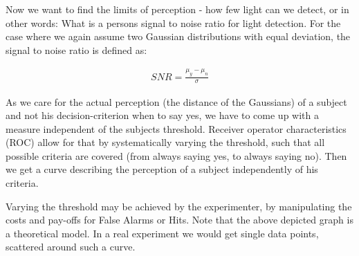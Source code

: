 \documentclass[../main/Notes.tex]{subfiles}
\begin{document}
Now we want to find the limits of perception - how few light can we detect, or in other words: What is a persons signal to noise ratio for light detection. For the case where we again assume two Gaussian distributions with equal deviation, the signal to noise ratio is defined as:

\begin{align*}
SNR = \frac{\mu_y-\mu_n}{\sigma}  
\end{align*} 

As we care for the actual perception (the distance of the Gaussians) of a subject and not his decision-criterion when to say yes, we have to come up with a measure independent of the subjects threshold. Receiver operator characteristics (ROC) allow for that by systematically varying the threshold, such that all possible criteria are covered (from always saying yes, to always saying no). Then we get a curve describing the perception of a subject independently of his criteria.

\bigskip
\begin{center}
\end{center}

Varying the threshold may be achieved by the experimenter, by manipulating the costs and pay-offs for False Alarms or Hits. Note that the above depicted graph is a theoretical model. In a real experiment we would get single data points, scattered around such a curve.
 
\end{document}
